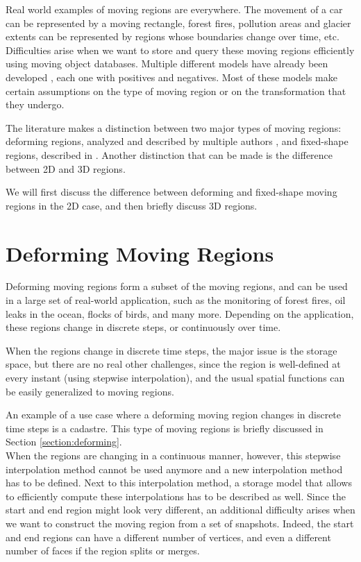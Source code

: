 \label{section:moving_regions}

Real world examples of moving regions are everywhere. The movement of a car can be represented by a moving rectangle, forest fires, pollution areas and glacier extents can be represented by regions whose boundaries change over time, etc. Difficulties arise when we want to store and query these moving regions efficiently using moving object databases. Multiple different models have already been developed \cite{fmregion,polyhedra,model_structure_for_mod}, each one with positives and negatives. Most of these models make certain assumptions on the type of moving region or on the transformation that they undergo.

The literature makes a distinction between two major types of moving regions: deforming regions, analyzed and described by multiple authors \cite{polyhedra,model_structure_for_mod,moving_obj_foundation}, and fixed-shape regions, described in \cite{fmregion}. Another distinction that can be made is the difference between 2D and 3D regions. 

We will first discuss the difference between deforming and fixed-shape moving regions in the 2D case, and then briefly discuss 3D regions.

\section{Deforming Moving Regions}
\label{section:deforming_regions}

Deforming moving regions form a subset of the moving regions, and can be used in a large set of real-world application, such as the monitoring of forest fires, oil leaks in the ocean, flocks of birds, and many more. Depending on the application, these regions change in discrete steps, or continuously over time. 

When the regions change in discrete time steps, the major issue is the storage space, but there are no real other challenges, since the region is well-defined at every instant (using stepwise interpolation), and the usual spatial functions can be easily generalized to moving regions.

An example of a use case where a deforming moving region changes in discrete time steps is a cadastre. This type of moving regions is briefly discussed in Section \ref{section:deforming}. \\

When the regions are changing in a continuous manner, however, this stepwise interpolation method cannot be used anymore and a new interpolation method has to be defined. Next to this interpolation method, a storage model that allows to efficiently compute these interpolations has to be described as well. Since the start and end region might look very different, an additional difficulty arises when we want to construct the moving region from a set of snapshots. Indeed, the start and end regions can have a different number of vertices, and even a different number of faces if the region splits or merges.

